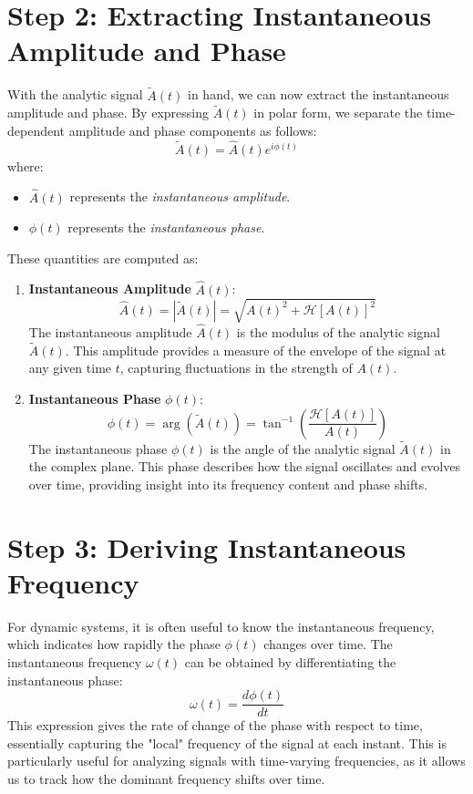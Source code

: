\documentclass[12pt]{article}
\begin{document}
\section*{Step 2: Extracting Instantaneous Amplitude and Phase}

With the analytic signal \( \tilde{A}(t) \) in hand, we can now extract the instantaneous amplitude and phase. By expressing \( \tilde{A}(t) \) in polar form, we separate the time-dependent amplitude and phase components as follows:
\[
\tilde{A}(t) = \hat{A}(t) e^{i \phi(t)}
\]
where:
\begin{itemize}
    \item \( \hat{A}(t) \) represents the \textit{instantaneous amplitude}.
    \item \( \phi(t) \) represents the \textit{instantaneous phase}.
\end{itemize}

These quantities are computed as:
\begin{enumerate}
    \item \textbf{Instantaneous Amplitude} \( \hat{A}(t) \):
    \[
    \hat{A}(t) = |\tilde{A}(t)| = \sqrt{A(t)^2 + \mathcal{H}[A(t)]^2}
    \]
    The instantaneous amplitude \( \hat{A}(t) \) is the modulus of the analytic signal \( \tilde{A}(t) \). This amplitude provides a measure of the envelope of the signal at any given time \( t \), capturing fluctuations in the strength of \( A(t) \).

    \item \textbf{Instantaneous Phase} \( \phi(t) \):
    \[
    \phi(t) = \arg(\tilde{A}(t)) = \tan^{-1} \left( \frac{\mathcal{H}[A(t)]}{A(t)} \right)
    \]
    The instantaneous phase \( \phi(t) \) is the angle of the analytic signal \( \tilde{A}(t) \) in the complex plane. This phase describes how the signal oscillates and evolves over time, providing insight into its frequency content and phase shifts.
\end{enumerate}



\section*{Step 3: Deriving Instantaneous Frequency}

For dynamic systems, it is often useful to know the instantaneous frequency, which indicates how rapidly the phase \( \phi(t) \) changes over time. The instantaneous frequency \( \omega(t) \) can be obtained by differentiating the instantaneous phase:
\[
\omega(t) = \frac{d\phi(t)}{dt}
\]
This expression gives the rate of change of the phase with respect to time, essentially capturing the "local" frequency of the signal at each instant. This is particularly useful for analyzing signals with time-varying frequencies, as it allows us to track how the dominant frequency shifts over time.
\end{document}
